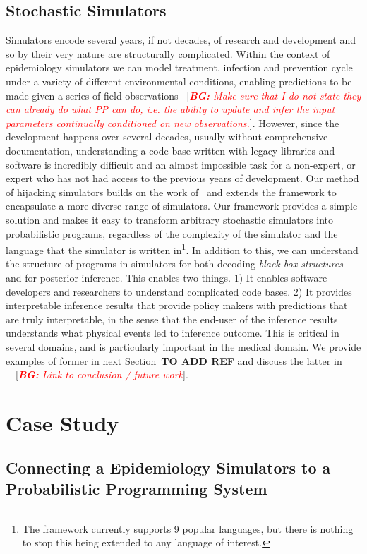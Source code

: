 \documentclass{article}
\newcommand{\bg}[1]{~{{[{\it \textcolor{red}{{\bf BG:} #1}}]}}}
\begin{document}
\subsection{Stochastic Simulators}

Simulators encode several years, if not decades, of research and development and so by their very nature are structurally complicated. Within the context of epidemiology simulators we can model treatment, infection and prevention cycle under a variety of different environmental conditions, enabling predictions to be made given a series of field observations \bg{Make sure that I do not state they can already do what PP can do, i.e. the ability to update and infer the input parameters continually conditioned on new observations.}. However, since the development happens over several decades, usually without comprehensive documentation, understanding a code base written with legacy libraries and software is incredibly difficult and an almost impossible task for a non-expert, or expert who has not had access to the previous years of development. Our method of hijacking simulators builds on the work of~\cite{baydin2018efficient} and extends the framework to encapsulate a more diverse range of simulators. Our framework provides a simple solution and makes it easy to transform arbitrary stochastic simulators into probabilistic programs, regardless of the complexity of the simulator and the language that the simulator is written in\footnote{The framework currently supports 9 popular languages, but there is nothing to stop this being extended to any language of interest.}. In addition to this, we can understand the structure of programs in simulators for both decoding \emph{black-box structures} and for posterior inference. This enables two things. 1) It enables software developers and researchers to understand complicated code bases. 2) It provides interpretable inference results that provide policy makers with predictions that are truly interpretable, in the sense that the end-user of the inference results understands what physical events led to inference outcome. This is critical in several domains, and is particularly important in the medical domain. We provide examples of former in next Section~\textbf{TO ADD REF} and discuss the latter in ~\bg{Link to conclusion / future work}.


\section{Case Study}
\subsection{Connecting a Epidemiology Simulators to a Probabilistic Programming System}
\end{document}
